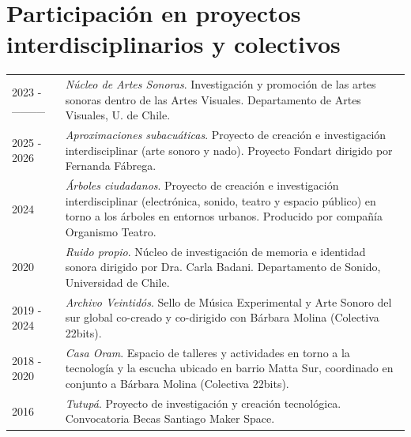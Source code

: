 \documentclass[a4paper,11pt]{article}
\makeatletter
\renewcommand{\arraystretch}{1.08}
\newenvironment{jobshort}[2]
    {
    \begin{tabularx}{\linewidth}{@{}l X r@{}}
    \textbf{#1} & \hfill &  #2 \\[3.75pt]
    \end{tabularx}
    }
    {
    }
\makeatother
\begin{document}
\section{Participación en proyectos interdisciplinarios y colectivos}
\begin{tabularx}{\linewidth}{@{}l X@{}}

2023 - \_\_\_\_ & \textit{Núcleo de Artes Sonoras}. Investigación y promoción de las artes sonoras dentro de las Artes Visuales. Departamento de Artes Visuales, U. de Chile. \\

2025 - 2026 & \textit{Aproximaciones subacuáticas}. Proyecto de creación e investigación interdisciplinar (arte sonoro y nado). Proyecto Fondart dirigido por Fernanda Fábrega. \\

2024 & \textit{Árboles ciudadanos}. Proyecto de creación e investigación interdisciplinar (electrónica, sonido, teatro y espacio público) en torno a los árboles en entornos urbanos. Producido por compañía Organismo Teatro. \\

2020 & \textit{Ruido propio}. Núcleo de investigación de memoria e identidad sonora dirigido por Dra. Carla Badani. Departamento de Sonido, Universidad de Chile. \\

2019 - 2024 & \textit{Archivo Veintidós}. Sello de Música Experimental y Arte Sonoro del sur global co-creado y co-dirigido con Bárbara Molina (Colectiva 22bits). \\

2018 - 2020 & \textit{Casa Oram}. Espacio de talleres y actividades en torno a la tecnología y la escucha ubicado en barrio Matta Sur, coordinado en conjunto a Bárbara Molina (Colectiva 22bits). \\

2016 & \textit{Tutupá}. Proyecto de investigación y creación tecnológica. Convocatoria Becas Santiago Maker Space. \\

\end{tabularx}

\newpage
\small
\setlength{\parskip}{0.05em}
\renewcommand{\arraystretch}{0.9}
\titlespacing{\section}{0pt}{6pt}{3pt}

\end{document}
